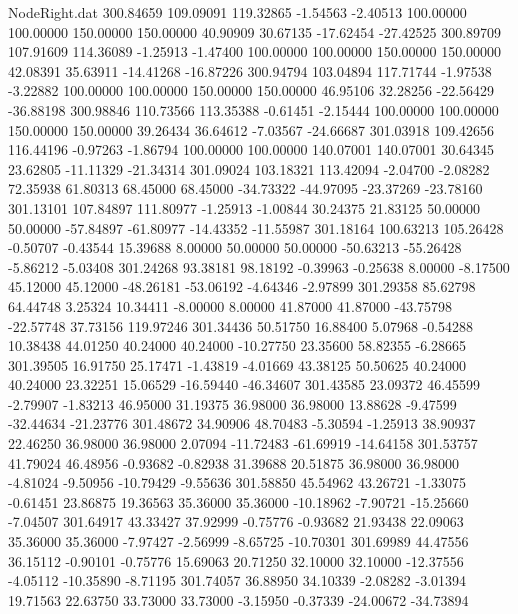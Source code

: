 \begin{filecontents}{NodeRight.dat}
 300.84659  109.09091  119.32865    -1.54563   -2.40513  100.00000  100.00000  150.00000  150.00000   40.90909   30.67135  -17.62454  -27.42525
 300.89709  107.91609  114.36089    -1.25913   -1.47400  100.00000  100.00000  150.00000  150.00000   42.08391   35.63911  -14.41268  -16.87226
 300.94794  103.04894  117.71744    -1.97538   -3.22882  100.00000  100.00000  150.00000  150.00000   46.95106   32.28256  -22.56429  -36.88198
 300.98846  110.73566  113.35388    -0.61451   -2.15444  100.00000  100.00000  150.00000  150.00000   39.26434   36.64612   -7.03567  -24.66687
 301.03918  109.42656  116.44196    -0.97263   -1.86794  100.00000  100.00000  140.07001  140.07001   30.64345   23.62805  -11.11329  -21.34314
 301.09024  103.18321  113.42094    -2.04700   -2.08282   72.35938   61.80313   68.45000   68.45000  -34.73322  -44.97095  -23.37269  -23.78160
 301.13101  107.84897  111.80977    -1.25913   -1.00844   30.24375   21.83125   50.00000   50.00000  -57.84897  -61.80977  -14.43352  -11.55987
 301.18164  100.63213  105.26428    -0.50707   -0.43544   15.39688    8.00000   50.00000   50.00000  -50.63213  -55.26428   -5.86212   -5.03408
 301.24268   93.38181   98.18192    -0.39963   -0.25638    8.00000   -8.17500   45.12000   45.12000  -48.26181  -53.06192   -4.64346   -2.97899
 301.29358   85.62798   64.44748     3.25324   10.34411   -8.00000    8.00000   41.87000   41.87000  -43.75798  -22.57748   37.73156  119.97246
 301.34436   50.51750   16.88400     5.07968   -0.54288   10.38438   44.01250   40.24000   40.24000  -10.27750   23.35600   58.82355   -6.28665
 301.39505   16.91750   25.17471    -1.43819   -4.01669   43.38125   50.50625   40.24000   40.24000   23.32251   15.06529  -16.59440  -46.34607
 301.43585   23.09372   46.45599    -2.79907   -1.83213   46.95000   31.19375   36.98000   36.98000   13.88628   -9.47599  -32.44634  -21.23776
 301.48672   34.90906   48.70483    -5.30594   -1.25913   38.90937   22.46250   36.98000   36.98000    2.07094  -11.72483  -61.69919  -14.64158
 301.53757   41.79024   46.48956    -0.93682   -0.82938   31.39688   20.51875   36.98000   36.98000   -4.81024   -9.50956  -10.79429   -9.55636
 301.58850   45.54962   43.26721    -1.33075   -0.61451   23.86875   19.36563   35.36000   35.36000  -10.18962   -7.90721  -15.25660   -7.04507
 301.64917   43.33427   37.92999    -0.75776   -0.93682   21.93438   22.09063   35.36000   35.36000   -7.97427   -2.56999   -8.65725  -10.70301
 301.69989   44.47556   36.15112    -0.90101   -0.75776   15.69063   20.71250   32.10000   32.10000  -12.37556   -4.05112  -10.35890   -8.71195
 301.74057   36.88950   34.10339    -2.08282   -3.01394   19.71563   22.63750   33.73000   33.73000   -3.15950   -0.37339  -24.00672  -34.73894

\end{filecontents}
